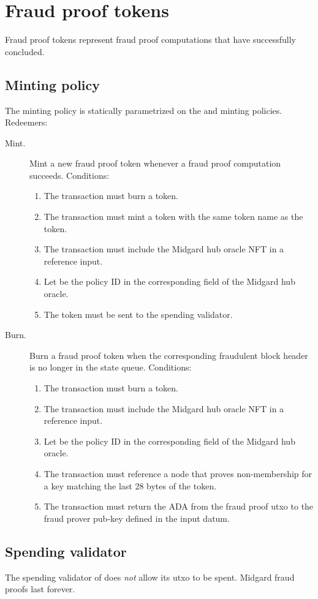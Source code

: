 \documentclass[../midgard.tex]{subfiles}
\begin{document}
\section{Fraud proof tokens}
\label{h:fraud-proof-tokens}

Fraud proof tokens represent fraud proof computations that have successfully concluded.

\subsection{Minting policy}
\label{h:fraud-proof-tokens-minting-policy}

The  minting policy is statically parametrized on the  and  minting policies. Redeemers:

\begin{description}
    \item[Mint.] Mint a new fraud proof token whenever a fraud proof computation succeeds. Conditions:
        \begin{enumerate}
            \item The transaction must burn a  token.
            \item The transaction must mint a  token with the same token name as the  token.
            \item The transaction must include the Midgard hub oracle NFT in a reference input.
            \item Let  be the policy ID in the corresponding field of the Midgard hub oracle.
            \item The  token must be sent to the  spending validator.
        \end{enumerate}
    \item[Burn.] Burn a fraud proof token when the corresponding fraudulent block header is no longer in the state queue. Conditions:
        \begin{enumerate}
            \item The transaction must burn a  token.
            \item The transaction must include the Midgard hub oracle NFT in a reference input.
            \item Let  be the policy ID in the corresponding field of the Midgard hub oracle.
            \item The transaction must reference a  node that proves non-membership for a key matching the last 28 bytes of the  token.
            \item The transaction must return the ADA from the fraud proof utxo to the fraud prover pub-key defined in the input datum.
        \end{enumerate}
\end{description}

\subsection{Spending validator}
\label{h:fraud-proof-tokens-spending-validator}

The spending validator of  does \emph{not} allow its utxo to be spent. Midgard fraud proofs last forever.
\end{document}
